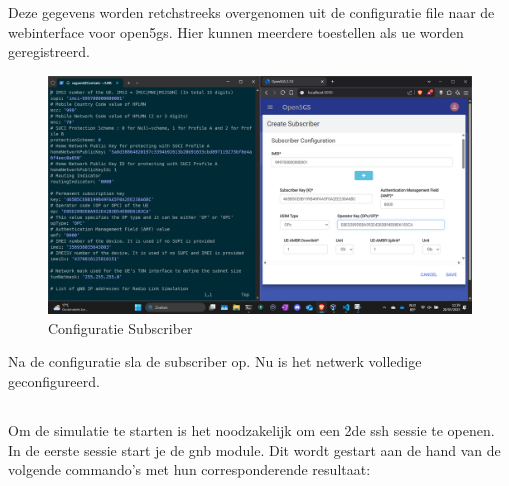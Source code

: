 Deze gegevens worden retchstreeks overgenomen uit de configuratie file naar de webinterface voor \gls{open5gs}. Hier kunnen meerdere toestellen als \gls{ue} worden geregistreerd. 
\begin{figure}[H]
    \includegraphics[width=\linewidth]{../graphics/POC-subConfig.png}
    \caption{Configuratie Subscriber}
    \label{fig:SubConfig}
\end{figure}

Na de configuratie sla de subscriber op. Nu is het netwerk volledige geconfigureerd. 

\subsection{}%
\label{sec:run}%

Om de simulatie te starten is het noodzakelijk om een 2de ssh sessie te openen.
In de eerste sessie start je de \gls{gnb} module. Dit wordt gestart aan de hand van de volgende commando's met hun corresponderende resultaat:

